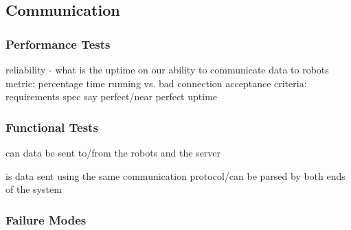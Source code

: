 
\subsection{Communication}
\label{sec:verification_comm}


\subsubsection{Performance Tests}
\label{sec:comm_pt}

reliability - what is the uptime on our ability to communicate data to robots
metric: percentage time running vs. bad connection
acceptance criteria: requirements spec say perfect/near perfect uptime

\subsubsection{Functional Tests}
\label{sec:comm_ft}

can data be sent to/from the robots and the server

is data sent using the same communication protocol/can be parsed by both ends of the system

\subsubsection{Failure Modes}
\label{sec:comm_fm}

